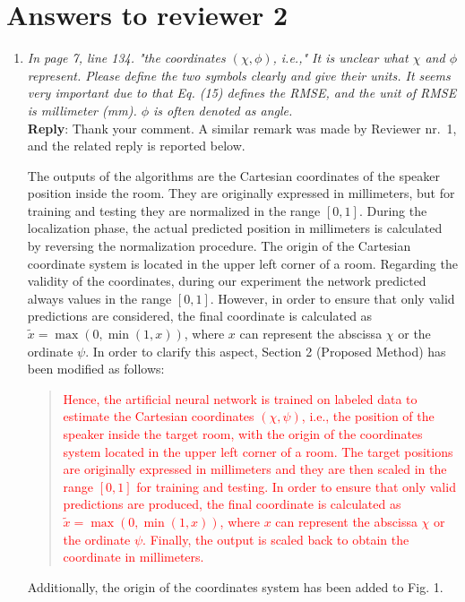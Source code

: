 \documentclass[11pt, technote, letterpaper, oneside, onecolumn]{IEEEtran}
\begin{document}
\section{Answers to reviewer 2}\label{sec:rev2}
\begin{enumerate}
\item \textit{In page 7, line 134. "the coordinates $(\chi,\phi)$, i.e.," It is unclear what $\chi$ and $\phi$ represent. Please define the two symbols clearly and give their units. It seems very important due to that Eq. (15) defines the RMSE, and the unit of RMSE is millimeter (mm). $\phi$ is often denoted as angle.\\}
\textbf{Reply}: Thank your comment. A similar remark was made by Reviewer nr.\ 1, and the related reply is reported below.

 The outputs of the algorithms are the Cartesian coordinates of the speaker position inside the room. They are originally expressed in millimeters, but for training and testing they are normalized in the range $[0,1]$. During the localization phase, the actual predicted position in millimeters is calculated by reversing the normalization procedure. The origin of the Cartesian coordinate system is located in the upper left corner of a room. Regarding the validity of the coordinates, during our experiment the network predicted always values in the range $[0,1]$. However, in order to ensure that only valid predictions are considered, the final coordinate is calculated as $\tilde{x} =\max(0, \min(1, x))$, where $x$ can represent the abscissa $\chi$ or the ordinate $\psi$.  In order to clarify this aspect, Section 2 (Proposed Method) has been modified as follows:
\begin{quote}
	\textcolor{red}{Hence, the artificial neural network is trained on labeled data to estimate the Cartesian coordinates $\left ( \chi,\psi \right )$, i.e., the position of the speaker inside the target room, with the origin of the coordinates system located in the upper left corner of a room. The target positions are originally expressed in millimeters and they are then scaled in the range $[0,1]$ for training and testing. In order to ensure that only valid predictions are produced, the final coordinate is calculated as $\tilde{x} =\max(0, \min(1, x))$, where $x$ can represent the abscissa $\chi$ or the ordinate $\psi$. Finally, the output is scaled back to obtain the coordinate in millimeters.}
\end{quote}
Additionally, the origin of the coordinates system has been added to Fig. 1.


\end{enumerate}
\end{document}
